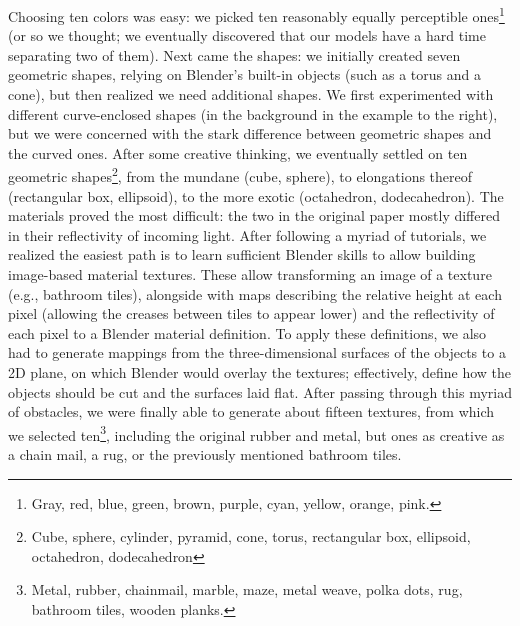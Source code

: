 Choosing ten colors was easy: we picked ten reasonably equally perceptible ones\footnote{Gray, red, blue, green, brown, purple, cyan, yellow, orange, pink.} (or so we thought; we eventually discovered that our models have a hard time separating two of them). Next came the shapes: we initially created seven geometric shapes, relying on Blender’s built-in objects (such as a torus and a cone), but then realized we need additional shapes. We first experimented with different curve-enclosed shapes (in the background in the example to the right), but we were concerned with the stark difference between geometric shapes and the curved ones. After some creative thinking, we eventually settled on ten geometric shapes\footnote{Cube, sphere, cylinder, pyramid, cone, torus, rectangular box, ellipsoid, octahedron, dodecahedron}, from the mundane (cube, sphere), to elongations thereof (rectangular box, ellipsoid), to the more exotic (octahedron, dodecahedron). The materials proved the most difficult: the two in the original paper mostly differed in their reflectivity of incoming light. After following a myriad of tutorials, we realized the easiest path is to learn sufficient Blender skills to allow building image-based material textures. These allow transforming an image of a texture (e.g., bathroom tiles), alongside with maps describing the relative height at each pixel (allowing the creases between tiles to appear lower) and the reflectivity of each pixel to a Blender material definition. To apply these definitions, we also had to generate mappings from the three-dimensional surfaces of the objects to a 2D plane, on which Blender would overlay the textures; effectively, define how the objects should be cut and the surfaces laid flat. After passing through this myriad of obstacles, we were finally able to generate about fifteen textures, from which we selected ten\footnote{Metal, rubber, chainmail, marble, maze, metal weave, polka dots, rug, bathroom tiles, wooden planks.}, including the original rubber and metal, but ones as creative as a chain mail, a rug, or the previously mentioned bathroom tiles. 


